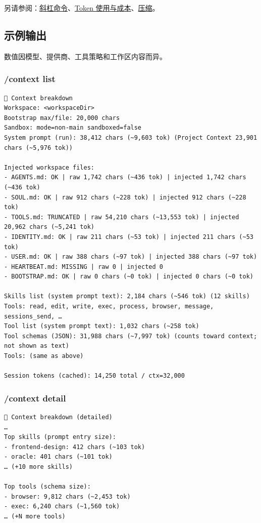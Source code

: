 另请参阅：\href{/tools/slash-commands}{斜杠命令}、\href{/reference/token-use}{Token 使用与成本}、\href{/concepts/compaction}{压缩}。

\subsection{示例输出}


数值因模型、提供商、工具策略和工作区内容而异。

\subsubsection{/context list}


\begin{lstlisting}
🧠 Context breakdown
Workspace: <workspaceDir>
Bootstrap max/file: 20,000 chars
Sandbox: mode=non-main sandboxed=false
System prompt (run): 38,412 chars (~9,603 tok) (Project Context 23,901 chars (~5,976 tok))

Injected workspace files:
- AGENTS.md: OK | raw 1,742 chars (~436 tok) | injected 1,742 chars (~436 tok)
- SOUL.md: OK | raw 912 chars (~228 tok) | injected 912 chars (~228 tok)
- TOOLS.md: TRUNCATED | raw 54,210 chars (~13,553 tok) | injected 20,962 chars (~5,241 tok)
- IDENTITY.md: OK | raw 211 chars (~53 tok) | injected 211 chars (~53 tok)
- USER.md: OK | raw 388 chars (~97 tok) | injected 388 chars (~97 tok)
- HEARTBEAT.md: MISSING | raw 0 | injected 0
- BOOTSTRAP.md: OK | raw 0 chars (~0 tok) | injected 0 chars (~0 tok)

Skills list (system prompt text): 2,184 chars (~546 tok) (12 skills)
Tools: read, edit, write, exec, process, browser, message, sessions_send, …
Tool list (system prompt text): 1,032 chars (~258 tok)
Tool schemas (JSON): 31,988 chars (~7,997 tok) (counts toward context; not shown as text)
Tools: (same as above)

Session tokens (cached): 14,250 total / ctx=32,000
\end{lstlisting}


\subsubsection{/context detail}


\begin{lstlisting}
🧠 Context breakdown (detailed)
…
Top skills (prompt entry size):
- frontend-design: 412 chars (~103 tok)
- oracle: 401 chars (~101 tok)
… (+10 more skills)

Top tools (schema size):
- browser: 9,812 chars (~2,453 tok)
- exec: 6,240 chars (~1,560 tok)
… (+N more tools)
\end{lstlisting}


